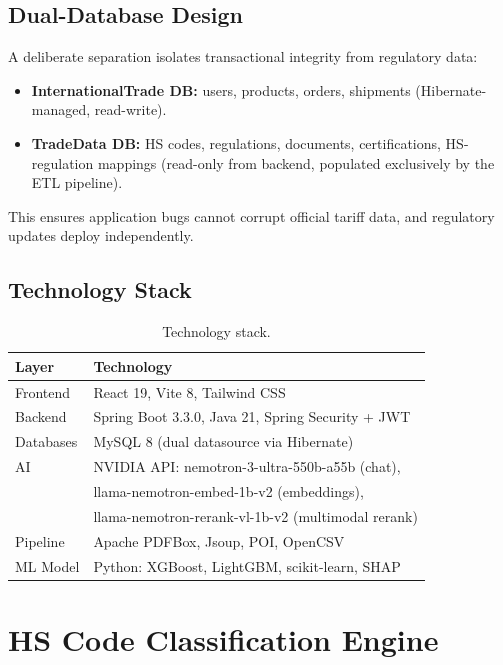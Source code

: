 \documentclass[conference]{IEEEtran}
\begin{document}
\subsection{Dual-Database Design}
A deliberate separation isolates transactional integrity from regulatory
data:
\begin{itemize}
\item \textbf{InternationalTrade DB:} users, products, orders, shipments
(Hibernate-managed, read-write).
\item \textbf{TradeData DB:} HS codes, regulations, documents,
certifications, HS-regulation mappings (read-only from backend, populated
exclusively by the ETL pipeline).
\end{itemize}
This ensures application bugs cannot corrupt official tariff data, and
regulatory updates deploy independently.

\subsection{Technology Stack}
\begin{table}[h]
\centering
\caption{Technology stack.}
\label{tab:stack}
\begin{tabular}{@{}ll@{}}
\toprule
\textbf{Layer} & \textbf{Technology} \\
\midrule
Frontend  & React 19, Vite 8, Tailwind CSS \\
Backend   & Spring Boot 3.3.0, Java 21, Spring Security + JWT \\
Databases & MySQL 8 (dual datasource via Hibernate) \\
AI        & NVIDIA API: nemotron-3-ultra-550b-a55b (chat), \\
          & llama-nemotron-embed-1b-v2 (embeddings), \\
          & llama-nemotron-rerank-vl-1b-v2 (multimodal rerank) \\
Pipeline  & Apache PDFBox, Jsoup, POI, OpenCSV \\
ML Model  & Python: XGBoost, LightGBM, scikit-learn, SHAP \\
\bottomrule
\end{tabular}
\end{table}

\section{HS Code Classification Engine}
\end{document}
